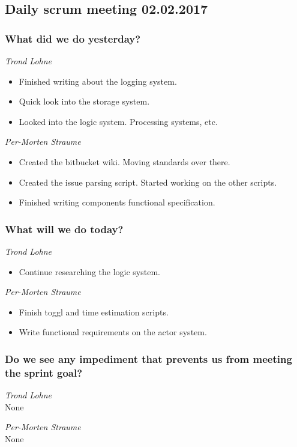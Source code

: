 \documentclass{article}
\begin{document}
\begin{center}
\subsection*{Daily scrum meeting 02.02.2017}
\end{center}
\bigskip


\subsubsection*{What did we do yesterday?}

\noindent\textit{Trond Lohne}
\begin{itemize}
    \item
    Finished writing about the logging system.

    \item
    Quick look into the storage system.

    \item
    Looked into the logic system. Processing systems, etc.

\end{itemize}

\medskip

\noindent\textit{Per-Morten Straume}
\begin{itemize}
    \item
    Created the bitbucket wiki. Moving standards over there.

    \item
    Created the issue parsing script. Started working on the other scripts.

    \item
    Finished writing components functional specification.

\end{itemize}

\subsubsection*{What will we do today?}

\noindent\textit{Trond Lohne}
\begin{itemize}
    \item
    Continue researching the logic system.

\end{itemize}

\medskip

\noindent\textit{Per-Morten Straume}
\begin{itemize}
    \item
    Finish toggl and time estimation scripts.

    \item
    Write functional requirements on the actor system.
\end{itemize}

\subsubsection*{Do we see any impediment that prevents us from meeting the sprint goal?}

\noindent\textit{Trond Lohne}\\
None

\medskip

\noindent\textit{Per-Morten Straume}\\
None
\end{document}
